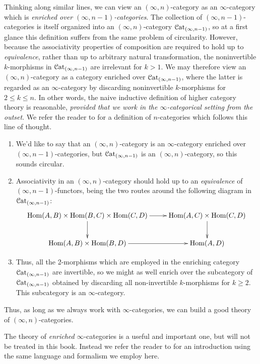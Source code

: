 \begin{itemize}
Thinking along similar lines, we can view an $(\infty,n)$-category as an $\infty$-category which is {\em enriched over $(\infty,n-1)$-categories}. The collection of $(\infty,n-1)$-categories is itself organized into an $(\infty,n)$-category $\operatorname{\mathcal{C}at}_{(\infty,n-1)}$, so at a first glance this definition suffers from the same problem of circularity. However, because the associativity properties of composition are required to hold up to {\em equivalence}, rather than up to arbitrary natural transformation, the noninvertible $k$-morphisms in $\operatorname{\mathcal{C}at}_{(\infty,n-1)}$ are irrelevant for $k > 1$. We may therefore view an $(\infty,n)$-category as a category enriched over $\operatorname{\mathcal{C}at}_{(\infty,n-1)}$, where the latter is regarded as an $\infty$-category by discarding noninvertible $k$-morphisms for $2 \leq k \leq n$.
In other words, the naive inductive definition of higher category theory is reasonable, {\em provided that we work in the $\infty$-categorical setting from the outset}. 
We refer the reader to \cite{tamsamani} for a definition of $n$-categories which follows this line of thought.
\begin{shaded}
\begin{enumerate}\squishlist
\item We'd like to say that an $(\infty,n)$-category is an $\infty$-category enriched over $(\infty,n-1)$-categories, but $\operatorname{\mathcal{C}at}_{(\infty,n-1)}$ is an $(\infty,n)$-category, so this sounds circular.
\item Associativity in an $(\infty,n)$-category should hold up to an \textit{equivalence} of $(\infty,n-1)$-functors, being the two routes around the following diagram in $\operatorname{\mathcal{C}at}_{(\infty,n-1)}$:
$$ \xymatrix{ \Hom(A,B) \times \Hom(B,C) \times \Hom(C,D) \ar[d]
 \ar[r] & \Hom(A,C) \times \Hom(C,D) \ar[d] \\
 \Hom(A,B) \times \Hom(B,D) \ar[r] & \Hom(A,D) }$$ 
\item Thus, all the 2-morphisms which are employed in the enriching category $\operatorname{\mathcal{C}at}_{(\infty,n-1)}$ are invertible, so we might as well enrich over the subcategory of $\operatorname{\mathcal{C}at}_{(\infty,n-1)}$ obtained by discarding all non-invertible $k$-morphisms for $k\geq 2$. This subcategory is an $\infty$-category.
\end{enumerate}
Thus, as long as we always work with $\infty$-categories, we can build a good theory of $(\infty,n)$-categories.
\end{shaded}

The theory of {\em enriched} $\infty$-categories is a useful and important one, but will not be treated in this book. Instead we refer the reader to \cite{DAG} for an introduction using the same language and formalism we employ here. 
\end{itemize}


